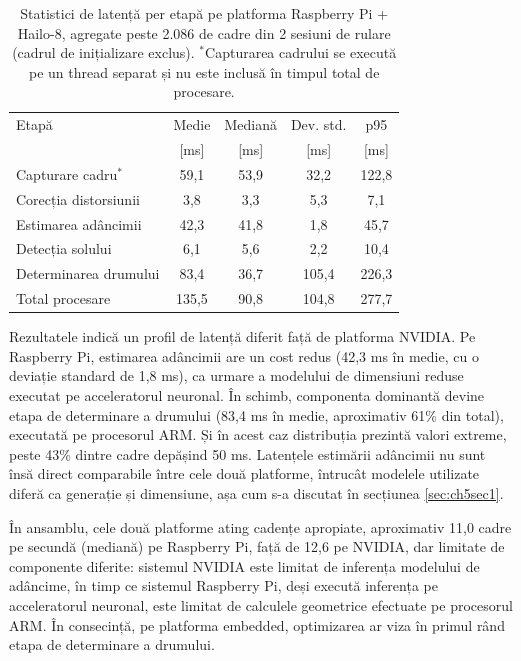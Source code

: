 \begin{table}[htbp]
    \centering
    \begin{tabular}{lcccc}
        \toprule
        Etapă & Medie & Mediană & Dev. std. & p95 \\
              & [ms] & [ms] & [ms] & [ms] \\
        \midrule
        Capturare cadru$^{*}$ & 59,1 & 53,9 & 32,2 & 122,8 \\
        Corecția distorsiunii & 3,8 & 3,3 & 5,3 & 7,1 \\
        Estimarea adâncimii & 42,3 & 41,8 & 1,8 & 45,7 \\
        Detecția solului & 6,1 & 5,6 & 2,2 & 10,4 \\
        Determinarea drumului & 83,4 & 36,7 & 105,4 & 226,3 \\
        \midrule
        Total procesare & 135,5 & 90,8 & 104,8 & 277,7 \\
        \bottomrule
    \end{tabular}
    \caption{Statistici de latență per etapă pe platforma Raspberry Pi + Hailo-8, agregate peste 2.086 de cadre din 2 sesiuni de rulare (cadrul de inițializare exclus). $^{*}$Capturarea cadrului se execută pe un thread separat și nu este inclusă în timpul total de procesare.}
    \label{tab:latenta_rpi}
\end{table}

Rezultatele indică un profil de latență diferit față de platforma NVIDIA. Pe Raspberry Pi, estimarea adâncimii are un cost redus (42,3 ms în medie, cu o deviație standard de 1,8 ms), ca urmare a modelului de dimensiuni reduse executat pe acceleratorul neuronal. În schimb, componenta dominantă devine etapa de determinare a drumului (83,4 ms în medie, aproximativ 61\% din total), executată pe procesorul ARM. Și în acest caz distribuția prezintă valori extreme, peste 43\% dintre cadre depășind 50 ms. Latențele estimării adâncimii nu sunt însă direct comparabile între cele două platforme, întrucât modelele utilizate diferă ca generație și dimensiune, așa cum s-a discutat în secțiunea \ref{sec:ch5sec1}.

În ansamblu, cele două platforme ating cadențe apropiate, aproximativ 11,0 cadre pe secundă (mediană) pe Raspberry Pi, față de 12,6 pe NVIDIA, dar limitate de componente diferite: sistemul NVIDIA este limitat de inferența modelului de adâncime, în timp ce sistemul Raspberry Pi, deși execută inferența pe acceleratorul neuronal, este limitat de calculele geometrice efectuate pe procesorul ARM. În consecință, pe platforma embedded, optimizarea ar viza în primul rând etapa de determinare a drumului.
